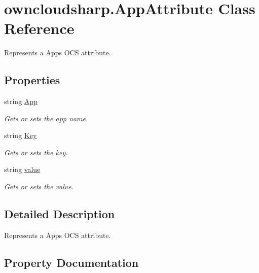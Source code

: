 \hypertarget{classowncloudsharp_1_1_app_attribute}{}\section{owncloudsharp.\+App\+Attribute Class Reference}
\label{classowncloudsharp_1_1_app_attribute}


Represents a Apps O\+C\+S attribute.  


\subsection*{Properties}
\begin{DoxyCompactItemize}
\item 
string \hyperlink{classowncloudsharp_1_1_app_attribute_a2e61b9d68112b9f9cf9b4ee21cf8fcf5}{App}
\begin{DoxyCompactList}\small\item\em Gets or sets the app name. \end{DoxyCompactList}\item 
string \hyperlink{classowncloudsharp_1_1_app_attribute_a769a8bd5697d9f17fbb51060195f4a3a}{Key}
\begin{DoxyCompactList}\small\item\em Gets or sets the key. \end{DoxyCompactList}\item 
string \hyperlink{classowncloudsharp_1_1_app_attribute_aad12b395949ee28c8c9fd9c2d6980dce}{value}
\begin{DoxyCompactList}\small\item\em Gets or sets the value. \end{DoxyCompactList}\end{DoxyCompactItemize}


\subsection{Detailed Description}
Represents a Apps O\+C\+S attribute. 



\subsection{Property Documentation}
\hypertarget{classowncloudsharp_1_1_app_attribute_a2e61b9d68112b9f9cf9b4ee21cf8fcf5}{}
